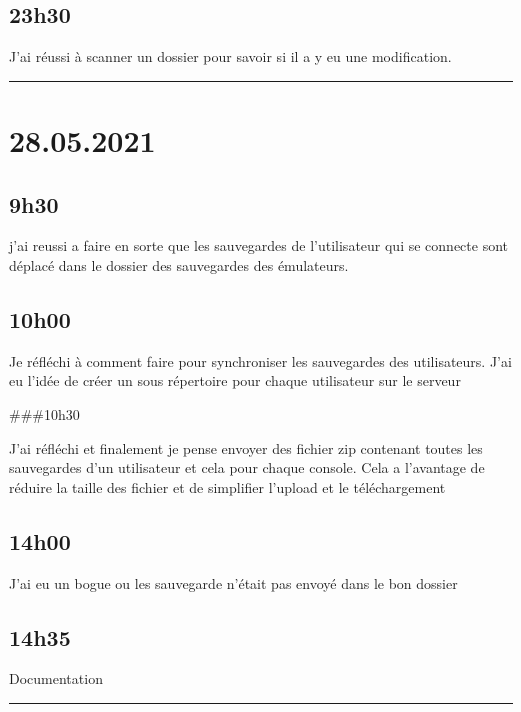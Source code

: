 \documentclass[a4paper,12pt,french]{sphinxmanual}
\begin{document}
\subsection{23h30}
\label{\detokenize{logbook:id167}}
\sphinxAtStartPar
J’ai réussi à scanner un dossier pour savoir si il a y eu une modification.


\bigskip\hrule\bigskip



\section{28.05.2021}
\label{\detokenize{logbook:id168}}

\subsection{9h30}
\label{\detokenize{logbook:id169}}
\sphinxAtStartPar
j’ai reussi a faire en sorte que les sauvegardes de l’utilisateur qui se connecte sont déplacé dans le dossier des sauvegardes des émulateurs.


\subsection{10h00}
\label{\detokenize{logbook:id170}}
\sphinxAtStartPar
Je réfléchi à comment faire pour synchroniser les sauvegardes des utilisateurs. J’ai eu l’idée de créer un sous répertoire pour chaque utilisateur sur le serveur

\sphinxAtStartPar
\#\#\#10h30

\sphinxAtStartPar
J’ai réfléchi et finalement je pense envoyer des fichier zip contenant toutes les sauvegardes d’un utilisateur et cela pour chaque console. Cela a l’avantage de réduire la taille des fichier et de simplifier l’upload et le téléchargement


\subsection{14h00}
\label{\detokenize{logbook:id171}}
\sphinxAtStartPar
J’ai eu un bogue ou les sauvegarde n’était pas envoyé dans le bon dossier


\subsection{14h35}
\label{\detokenize{logbook:id172}}
\sphinxAtStartPar
Documentation


\bigskip\hrule\bigskip
\end{document}
